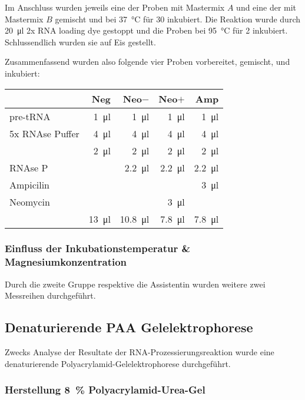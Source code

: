 \documentclass[a4paper,english]{scrreprt}
\begin{document}
Im Anschluss wurden jeweils eine der Proben mit Mastermix $A$ und eine der mit
Mastermix $B$ gemischt und bei \SI{37}{\celsius} für \SI{30}{\min} inkubiert.
Die Reaktion wurde durch \SI{20}{\ul} 2x RNA loading dye gestoppt und die
Proben bei \SI{95}{\celsius} für \SI{2}{\min} inkubiert. Schlussendlich wurden
sie auf Eis gestellt.

Zusammenfassend wurden also folgende vier Proben vorbereitet, gemischt, und
inkubiert:
\\

\begin{tabu}{lrrrr}
	\toprule
	                & Neg          & Neo$-$         & Neo$+$        & Amp \\
	\midrule
	pre-tRNA        & \SI{1}{\ul}  & \SI{1}{\ul}    & \SI{1}{\ul}   & \SI{1}{\ul} \\
	5x RNAse Puffer & \SI{4}{\ul}  & \SI{4}{\ul}    & \SI{4}{\ul}   & \SI{4}{\ul} \\
	      & \SI{2}{\ul}  & \SI{2}{\ul}    & \SI{2}{\ul}   & \SI{2}{\ul} \\
	RNAse P         &              & \SI{2.2}{\ul}  & \SI{2.2}{\ul} & \SI{2.2}{\ul} \\
	Ampicilin       &              &                &               & \SI{3}{\ul} \\
	Neomycin        &              &                & \SI{3}{\ul}   &             \\
	        & \SI{13}{\ul} & \SI{10.8}{\ul} & \SI{7.8}{\ul} & \SI{7.8}{\ul} \\
	\bottomrule
\end{tabu}

\subsubsection{Einfluss der Inkubationstemperatur \& Magnesiumkonzentration}

Durch die zweite Gruppe respektive die Assistentin wurden weitere zwei
Messreihen durchgeführt.

\subsection{Denaturierende PAA Gelelektrophorese}

Zwecks Analyse der Resultate der RNA-Prozessierungsreaktion wurde eine
denaturierende Polyacrylamid-Gelelektrophorese durchgeführt.

\subsubsection{Herstellung \SI{8}{\percent} Polyacrylamid-Urea-Gel}
\end{document}
